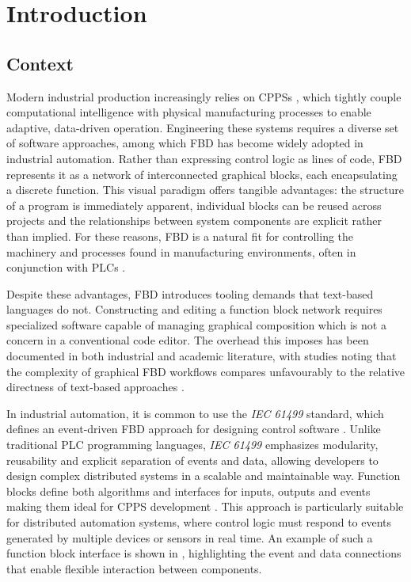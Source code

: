 \chapter{Introduction} \label{chap:introduction}

\section{Context}
Modern industrial production increasingly relies on \acp{CPPS} \cite{monostori_cyber-physical_2014}, which tightly couple computational intelligence with physical manufacturing processes to enable adaptive, data-driven operation. Engineering these systems requires a diverse set of software approaches, among which \ac{FBD} \cite{cho_function_1993} has become widely adopted in industrial automation. Rather than expressing control logic as lines of code, \ac{FBD} represents it as a network of interconnected graphical blocks, each encapsulating a discrete function. This visual paradigm offers tangible advantages: the structure of a program is immediately apparent, individual blocks can be reused across projects and the relationships between system components are explicit rather than implied. For these reasons, \ac{FBD} is a natural fit for controlling the machinery and processes found in manufacturing environments, often in conjunction with \acp{PLC} \cite{pinto_digital_2023, pang_formal_2015}.

Despite these advantages, \ac{FBD} introduces tooling demands that text-based languages do not. Constructing and editing a function block network requires specialized software capable of managing graphical composition which is not a concern in a conventional code editor. The overhead this imposes has been documented in both industrial and academic literature, with studies noting that the complexity of graphical \ac{FBD} workflows compares unfavourably to the relative directness of text-based approaches \cite{fischer_measuring_2021}.

In industrial automation, it is common to use the \textit{IEC 61499} standard, which defines an event-driven \ac{FBD} approach for designing control software \cite{sorokin_novel_2022}. Unlike traditional \ac{PLC} programming languages, \textit{IEC 61499} emphasizes modularity, reusability and explicit separation of events and data, allowing developers to design complex distributed systems in a scalable and maintainable way. Function blocks define both algorithms and interfaces for inputs, outputs and events making them ideal for \ac{CPPS} development \cite{garcia_engineering_2017}. This approach is particularly suitable for distributed automation systems, where control logic must respond to events generated by multiple devices or sensors in real time. An example of such a function block interface is shown in , highlighting the event and data connections that enable flexible interaction between components.

